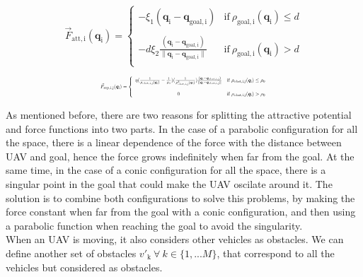 \documentclass[journal]{IEEEtran}
\newcommand*{\subb}[1]{_{\mathrm{#1}}}
\begin{document}
		\begin{equation} \label{eq:force_att}
		\vec{F}\subb{att, i}(\bm{q}\subb{i}) =  \left\lbrace  {\begin{array}{cc}
			- \xi\subb{1} (\bm{q}\subb{i}-\bm{q}\subb{goal, i})& \textrm{if} \ \rho\subb{goal, i}(\bm{q}\subb{i})\leq d \\
			\\
			-d \xi\subb{2} \frac{(\bm{q}\subb{i}-\bm{q}\subb{goal, i})}{\parallel\bm{q}\subb{i}-\bm{q}\subb{goal,i}\parallel}&\textrm{if} \ \rho\subb{goal, i}(\bm{q}\subb{i})> d \\
			\end{array} } \right.
		\end{equation}
		
		\begin{equation} \label{eq:force_rep}	
		\resizebox{0.5\textwidth}{!}{ $
			\vec{F}\subb{rep, i,j}(\bm{q}\subb{i}) =  \left\lbrace  {\begin{array}{cc}
				\eta (\frac{1}{\rho\subb{obst,i,j}(\bm{q}\subb{i})}-\frac{1}{\rho\subb{0}})(\frac{1}{\rho\subb{obst,i,j}^2(\bm{q}\subb{i})})\frac{(\bm{q}\subb{i}-\bm{q}\subb{obst,i,j})}{\parallel\bm{q}\subb{i}-\bm{q}\subb{obst,i,j} \parallel} & \textrm{if} \ \rho\subb{obst,i,j}(\bm{q}\subb{i})\leq \rho\subb{0} \\
				\\
				0 &\textrm{if} \ \rho\subb{obst,i,j}(\bm{q}\subb{i})> \rho\subb{0} \\
				\end{array} } \right. $}
		\end{equation}
		
		As mentioned before, there are two reasons for splitting the attractive potential and force functions into two parts. In the case of a parabolic configuration for all the space, there is a linear dependence of the force with the distance between UAV and goal, hence the force grows indefinitely when far from the goal. At the same time, in the case of a conic configuration for all the space, there is a singular point in the goal that could make the UAV oscilate around it. The solution is to combine both configurations to solve this problems, by making the force constant when far from the goal with a conic configuration, and then using a parabolic function when reaching the goal to avoid the singularity.\\
		
		When an UAV is moving, it also considers other vehicles as obstacles. We can define another set of obstacles $v'\subb{k} \ \forall \ k \in \{1, ...M\}$, that correspond to all the vehicles but considered as obstacles.
		
\end{document}
